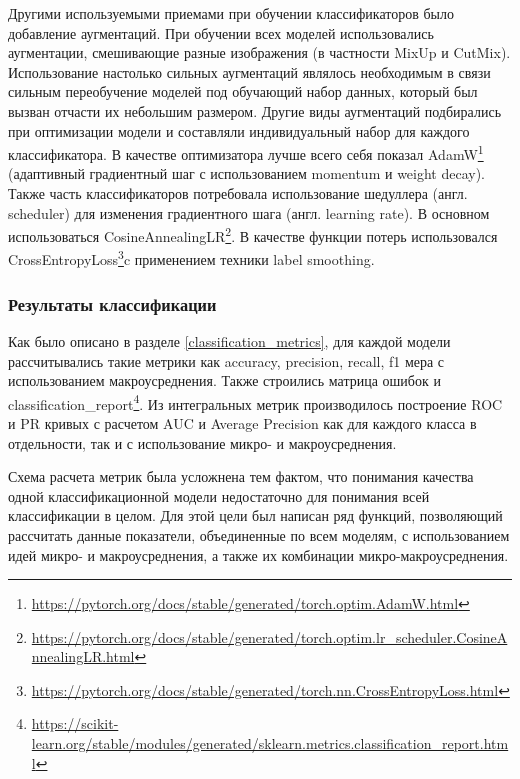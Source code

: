 \documentclass[a4paper,12pt]{extarticle}
\begin{document}
Другими используемыми приемами при обучении классификаторов было добавление аугментаций. При обучении всех моделей использовались аугментации, смешивающие разные изображения (в частности MixUp и CutMix\cite{cutmix}). Использование настолько сильных аугментаций являлось необходимым в связи сильным переобучение моделей под обучающий набор данных, который был вызван отчасти их небольшим размером. Другие виды аугментаций подбирались при оптимизации модели и составляли индивидуальный набор для каждого классификатора. В качестве оптимизатора лучше всего себя показал AdamW\footnote{\url{https://pytorch.org/docs/stable/generated/torch.optim.AdamW.html}} (адаптивный градиентный шаг с использованием momentum и weight decay). Также часть классификаторов потребовала использование шедуллера (англ. scheduler) для изменения градиентного шага (англ. learning rate). В основном использоваться CosineAnnealingLR\footnote{\url{https://pytorch.org/docs/stable/generated/torch.optim.lr_scheduler.CosineAnnealingLR.html}}. В качестве функции потерь использовался CrossEntropyLoss\footnote{\url{https://pytorch.org/docs/stable/generated/torch.nn.CrossEntropyLoss.html}}c применением техники label smoothing.

\subsubsection{Результаты классификации}

Как было описано в разделе \ref{classification_metrics}, для каждой модели рассчитывались такие метрики как accuracy, precision, recall, f1 мера с использованием макроусреднения. Также строились матрица ошибок и classification\_report\footnote{\url{https://scikit-learn.org/stable/modules/generated/sklearn.metrics.classification\_report.html}}. Из интегральных метрик производилось построение ROC и PR кривых с расчетом AUC и Average Precision как для каждого класса в отдельности, так и с использование микро- и макроусреднения.

Схема расчета метрик была усложнена тем фактом, что понимания качества одной классификационной модели недостаточно для понимания всей классификации в целом. Для этой цели был написан ряд функций, позволяющий рассчитать данные показатели, объединенные по всем моделям, с использованием идей микро- и макроусреднения, а также их комбинации микро-макроусреднения. 
\end{document}
